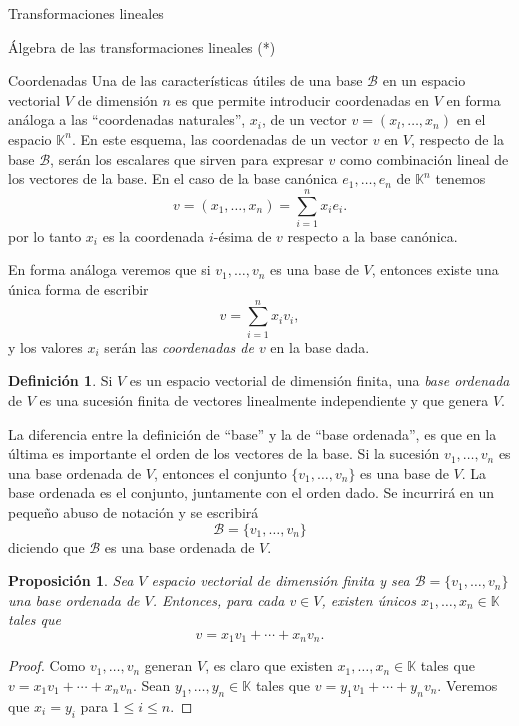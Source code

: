 \documentclass[a4paper,12pt,twoside,spanish,reqno]{amsbook}
\numberwithin{equation}{section}
\newtheorem{proposicion}[teorema]{Proposici\'on}
\theoremstyle{definition}
\newtheorem{definicion}[teorema]{Definici\'on}
\theoremstyle{remark}
\newcommand{\K}{\mathbb K}
\begin{document}
\begin{chapter}{Transformaciones lineales}
\begin{section}{Álgebra de las transformaciones lineales (*)}
    

        \end{section}




        


    \begin{section}{Coordenadas}\label{seccion-coordenadas}
        Una de las características útiles de una base $\mathcal B$ en un espacio vectorial  $V$ de dimensión $n$ es que permite introducir coordenadas en $V$ en forma análoga a las ``coordenadas naturales'', $x_i$, de un vector $v = (x_l,\ldots, x_n)$ en el espacio $\K^n$. En este esquema, las coordenadas de un vector $v$ en $V$, respecto de la base $\mathcal B$, serán los escalares que sirven para expresar $v$ como combinación lineal de los vectores de la base. En  el caso  de la base canónica $e_1,\ldots,e_n$ de $\K^n$ tenemos
        $$
        v = (x_1,\ldots,x_n) = \sum_{i=1}^{n} x_ie_i.
        $$
        por lo tanto $x_i$  es la coordenada $i$-ésima de $v$ respecto a la base canónica. 
        
        En  forma análoga veremos que si $v_1,\ldots,v_n$  es una base de $V$,  entonces existe una única forma de  escribir 
        $$
        v =  \sum_{i=1}^{n} x_iv_i,
        $$ 
        y los valores  $x_i$  serán las \textit{coordenadas de $v$} en la base dada. 
        
        \begin{definicion}
            Si $V$ es un espacio vectorial de dimensión finita, una \textit{base ordenada} de $V$ es una sucesión finita de vectores linealmente independiente y que genera $V$.
        \end{definicion}
        
        
        La diferencia entre la definición de ``base'' y la de ``base ordenada'',  es que en la última es  importante el orden de los vectores de la base. Si la sucesión $v_1,\ldots,v_n$ es una base ordenada de $V$, entonces el conjunto $\{v_1,\ldots,v_n\}$ es una base de $V$. La base ordenada es el conjunto, juntamente con el orden dado. Se incurrirá en un pequeño abuso de notación y se escribirá
        $$
        \mathcal{B} = \{v_1,\ldots,v_n\}
        $$
        diciendo que $\mathcal{B}$ es una base ordenada de $V$.
        
        \begin{proposicion}
            Sea $V$  espacio vectorial de dimensión finita y sea $\mathcal{B} = \{v_1,\ldots,v_n\}$ una base ordenada de $V$. Entonces, para cada $v \in V$,  existen únicos $x_1,\ldots,x_n \in \K$ tales que $$v =   x_1v_1 + \cdots +x_nv_n.$$
        \end{proposicion}
        \begin{proof}
            Como $v_1,\ldots,v_n$  generan $V$,  es claro que existen $x_1,\ldots,x_n \in \K$ tales que $v =   x_1v_1 + \cdots +x_nv_n$. Sean $y_1,\ldots,y_n \in \K$ tales que $v =   y_1v_1 + \cdots +y_nv_n$. Veremos que $x_i = y_i$ para $1 \le i \le n$.
            

\end{proof}
\end{section}
\end{chapter}
\end{document}
